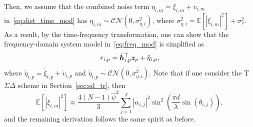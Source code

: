 \documentclass[10pt,twocolumn,twoside]{IEEEtran}
\newtheorem{Asm}{Assumption}
\begin{document}
Then, we assume that the combined noise term $\eta_{i,m} = \xi_{i,m} +  v_{i,m}$ in~\eqref{eq:dist_time_mod} has $\eta_{i,m} \sim \mathcal{CN}(0,\sigma^2_{\eta,i})$, where $\sigma^2_{\eta,i} = \mathbb{E}[|\xi_{i,m}|^2] + \sigma_v^2$.
As a result, by the time-frequency transformation, one can show that the frequency-domain system model in~\eqref{eq:freq_mod} is simplified as
\begin{equation}\label{eq:freq_mod_approx}
	r_{i,p} = \check \bh_{i,p}^\Tsf \bz_p+ \check \eta_{i,p}, %
\end{equation}
where $\check \eta_{i,p} = \check \xi_{i,p} + \check v_{i,p}$ and $ \check \eta_{i,p} \sim \mathcal{CN}(0,\sigma^2_{\eta,i})$.
Note that if one consider the T$\Sigma\Delta$
scheme in Section~\ref{sec:sd_tr}, then
\[
\mathbb{E}[|\xi_{i,m}|^2] \approx \frac{4(N-1) \hat \psi^2}{3}   \sum_{j=1}^J |\alpha_{i,j}|^2  \sin^2 \left( \frac{\pi d}{\lambda} \sin(\theta_{i,j})\right),
\]
and the remaining derivation follows the same spirit  as before.
%

\end{document}
